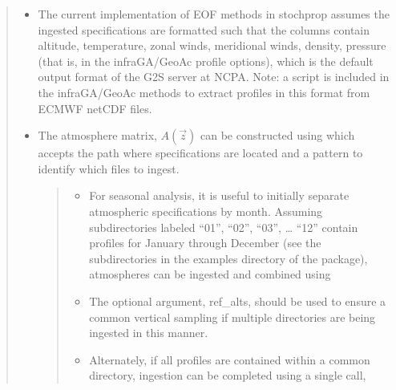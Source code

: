 \documentclass[letterpaper,10pt,english]{sphinxmanual}
\begin{document}
\begin{itemize}
\begin{quote}
\begin{itemize}
\item {} 
The current implementation of EOF methods in stochprop assumes the ingested specifications are formatted such that the columns contain altitude, temperature, zonal winds, meridional winds, density, pressure (that is,  in the infraGA/GeoAc profile options), which is the default output format of the G2S server at NCPA.  Note: a script is included in the infraGA/GeoAc methods to extract profiles in this format from ECMWF netCDF files.

\item {} 
The atmosphere matrix, \(A(\vec{z})\) can be constructed using  which accepts the path where specifications are located and a pattern to identify which files to ingest.
\begin{quote}
\begin{itemize}
\item {} 
For seasonal analysis, it is useful to initially separate atmospheric specifications by month.  Assuming subdirectories labeled “01”, “02”, “03”, … “12” contain profiles for January through December (see the subdirectories in the examples directory of the package), atmospheres can be ingested and combined using 

\item {} 
The optional argument, ref\_alts, should be used to ensure a common vertical sampling if multiple directories are being ingested in this manner.

\end{itemize}

\begin{sphinxVerbatim}[commandchars=\\\{\}]
    
    
             
           
\end{sphinxVerbatim}
\begin{itemize}
\item {} 
Alternately, if all profiles are contained within a common directory, ingestion can be completed using a single call,


\end{itemize}
\end{quote}
\end{itemize}
\end{quote}
\end{itemize}
\end{document}
